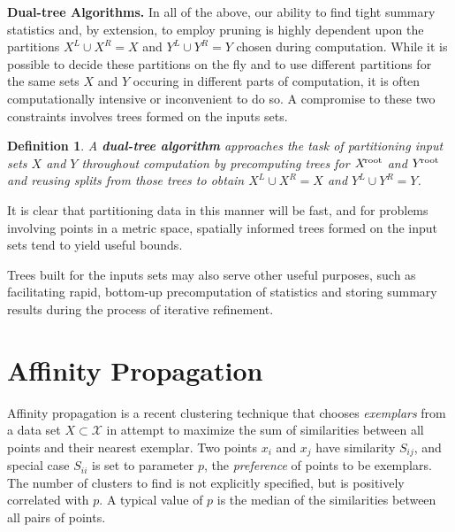 \documentclass{article}
\newtheorem{definition} {Definition}
\newcommand{\kdroot}[1]{#1^{\!\text{\rm root}}}
\newcommand{\kdleft}[1]{#1^{\!L}}
\newcommand{\kdright}[1]{#1^{\!R}}
\newcommand{\simil}[2]{S_{#1#2}}
\begin{document}

{\bf Dual-tree Algorithms.}  In all of the above, our ability to find
tight summary statistics and, by extension, to employ pruning is
highly dependent upon the partitions $\kdleft{X} \cup \kdright{X} = X$
and $\kdleft{Y} \cup \kdright{Y} = Y$ chosen during computation.
While it is possible to decide these partitions on the fly and to use
different partitions for the same sets $X$ and $Y$ occuring in
different parts of computation, it is often computationally intensive
or inconvenient to do so.  A compromise to these two constraints
involves trees formed on the inputs sets.
\begin{definition}
  A {\bf dual-tree algorithm} approaches the task of partitioning
  input sets $X$ and $Y$ throughout computation by precomputing trees
  for $\kdroot{X}$ and $\kdroot{Y}$ and reusing splits from those
  trees to obtain $\kdleft{X} \cup \kdright{X} = X$ and $\kdleft{Y}
  \cup \kdright{Y} = Y$.
\end{definition}
\noindent It is clear that partitioning data in this manner will be
fast, and for problems involving points in a metric space, spatially
informed trees formed on the input sets tend to yield useful bounds.

Trees built for the inputs sets may also serve other useful purposes,
such as facilitating rapid, bottom-up precomputation of statistics and
storing summary results during the process of iterative refinement.


\section{Affinity Propagation}


Affinity propagation \cite{affinity} is a recent clustering technique
that chooses {\em exemplars} from a data set $X \subset \mathcal{X}$
in attempt to maximize the sum of similarities between all points and
their nearest exemplar.  Two points $x_i$ and $x_j$ have similarity
$\simil{i}{j}$, and special case $\simil{i}{i}$ is set to parameter
$p$, the {\em preference} of points to be exemplars.  The number of
clusters to find is not explicitly specified, but is positively
correlated with $p$.  A typical value of $p$ is the median of the
similarities between all pairs of points.
\end{document}
